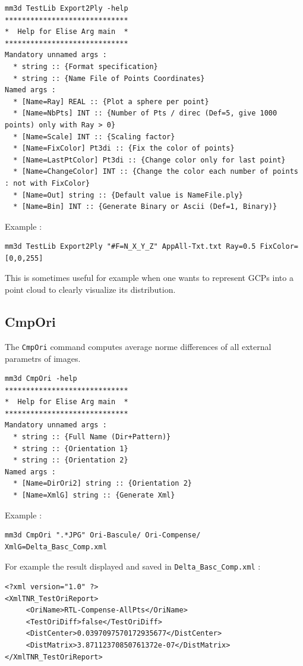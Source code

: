 \begin{verbatim}
mm3d TestLib Export2Ply -help
*****************************
*  Help for Elise Arg main  *
*****************************
Mandatory unnamed args : 
  * string :: {Format specification}
  * string :: {Name File of Points Coordinates}
Named args : 
  * [Name=Ray] REAL :: {Plot a sphere per point}
  * [Name=NbPts] INT :: {Number of Pts / direc (Def=5, give 1000 points) only with Ray > 0}
  * [Name=Scale] INT :: {Scaling factor}
  * [Name=FixColor] Pt3di :: {Fix the color of points}
  * [Name=LastPtColor] Pt3di :: {Change color only for last point}
  * [Name=ChangeColor] INT :: {Change the color each number of points : not with FixColor}
  * [Name=Out] string :: {Default value is NameFile.ply}
  * [Name=Bin] INT :: {Generate Binary or Ascii (Def=1, Binary)}
\end{verbatim}

Example :
\begin{verbatim}
mm3d TestLib Export2Ply "#F=N_X_Y_Z" AppAll-Txt.txt Ray=0.5 FixColor=[0,0,255]
\end{verbatim}

This is sometimes useful for example when one wants to represent GCPs into a point cloud to clearly visualize its distribution.

\subsection{CmpOri}
The {\tt CmpOri} command computes average norme differences of all external parametrs of images.

\begin{verbatim}
mm3d CmpOri -help
*****************************
*  Help for Elise Arg main  *
*****************************
Mandatory unnamed args : 
  * string :: {Full Name (Dir+Pattern)}
  * string :: {Orientation 1}
  * string :: {Orientation 2}
Named args : 
  * [Name=DirOri2] string :: {Orientation 2}
  * [Name=XmlG] string :: {Generate Xml}
\end{verbatim}

Example :
\begin{verbatim}
mm3d CmpOri ".*JPG" Ori-Bascule/ Ori-Compense/ XmlG=Delta_Basc_Comp.xml
\end{verbatim}

For example the result displayed and saved in {\tt Delta\_Basc\_Comp.xml} :
\begin{verbatim}
<?xml version="1.0" ?>
<XmlTNR_TestOriReport>
     <OriName>RTL-Compense-AllPts</OriName>
     <TestOriDiff>false</TestOriDiff>
     <DistCenter>0.0397097570172935677</DistCenter>
     <DistMatrix>3.87112370850761372e-07</DistMatrix>
</XmlTNR_TestOriReport>
\end{verbatim}


